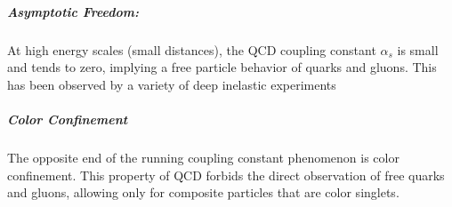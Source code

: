 \subparagraph{Asymptotic Freedom: }
At high energy scales (small distances), the QCD coupling constant $\alpha_s$ is small and tends to zero, implying a free particle behavior of quarks and gluons. This has been observed by a variety of deep inelastic experiments \cite{Deur:2014vea, Kim:1998kia, Altarelli:1996nm, RevModPhys.63.597, Kataev:2001kk, Alekhin:2012ig, Alekhin:2013nua, Blumlein:2006be, Aaron:2007xx, Chekanov:2007pa, Chekanov:2008af, Abramowicz:2010cka, Abramowicz:2010ke, Aaron:2009vs}


\subparagraph{Color Confinement}
The opposite end of the running coupling constant phenomenon is color confinement. This property of QCD forbids the direct observation of free quarks and gluons, allowing only for composite particles that are color singlets. 


%
%
%
%

%
%
%
%
%
%
%
%
%
%
%